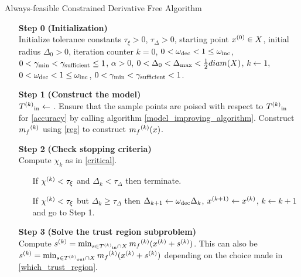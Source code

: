 \begin{algorithm}[H]
    \caption{Always-feasible Constrained Derivative Free Algorithm}
    \label{constrained_dfo}
    \begin{itemize}
        \item[\textbf{Step 0}] \textbf{(Initialization)} \\
            Initialize tolerance constants 
            $\tau_{\xi} > 0$,
            $\tau_{\Delta} > 0$,
            starting point $x^{(0)} \in X$,
            initial radius $\Delta_0 > 0$,
            iteration counter $k=0$,
            $0 < \omega_{\text{dec}} < 1 \le \omega_{\text{inc}}$,
            $0 < \gamma_{\text{min}} < \gamma_{\text{sufficient}} \le 1$,
            $\alpha > 0$,
            $0 < \Delta_0 < \Delta_{\text{max}} < \frac 1 2 diam(X)$,
            $k \gets 1$,
            $0 < \omega_{\text{dec}} < 1 \le \omega_{\text{inc}}$,
            $0 < \gamma_{\text{min}} < \gamma_{\text{sufficient}} < 1$.
            
        \item[\textbf{Step 1}] \textbf{(Construct the model)} \\
            ${T^{(k)}}_{\text{in}}\gets $ .
            Ensure that the sample points are poised with respect to ${T^{(k)}}_{\text{in}}$ for \cref{accuracy} by calling algorithm \cref{model_improving_algorithm}.
            Construct ${{m}_f}^{(k)}$ using \cref{reg} to construct ${{m}_f}^{(k)}(x)$.
        
        \item[\textbf{Step 2}] \textbf{(Check stopping criteria)} \\
            Compute $\chi_k$ as in \cref{critical}. \begin{itemize}
                \item[] If $ {\chi^{(k)}} < \tau_{\xi} $ and $\Delta_k<\tau_{\Delta}$ then terminate.
                \item[] If $ {\chi^{(k)}} < \tau_{\xi} $ but $\Delta_k\ge\tau_{\Delta}$ then 
                $\Delta_{k+1} \gets \omega_{\text{dec}}\Delta_{k}$, 
                $x^{(k+1)} \gets {x}^{(k)}$,
                $k \gets k+1$ and go to Step 1.
            \end{itemize}
        
        \item[\textbf{Step 3}] \textbf{(Solve the trust region subproblem)} \\
            Compute ${s}^{(k)} = \min_{s \in {T^{(k)}}_{\text{in}} \cap X} {{m}_f}^{(k)}({x}^{(k)} + {s}^{(k)})$.
            This can also be ${s}^{(k)} = \min_{s \in {T^{(k)}}_{\text{out}} \cap X} {{m}_f}^{(k)}({x}^{(k)} + {s}^{(k)})$ depending on the choice made in \cref{which_trust_region}.
            

\end{itemize}
\end{algorithm}

